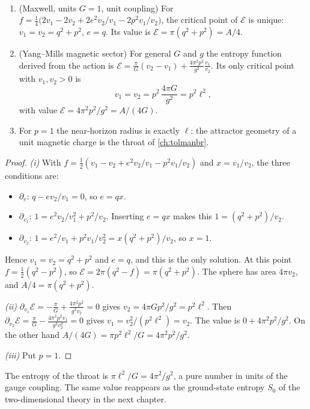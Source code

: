 \begin{theorem}[Attractor]\label{thm:attractor}\ver\
\begin{enumerate}[label=(\roman*)]
\item (Maxwell, units $G=1$, unit coupling) For $f=\frac14\bigl(2v_1-2v_2+2e^2v_2/v_1-2p^2v_1/v_2\bigr)$, the critical point of $\mathcal E$ is unique: $v_1=v_2=q^2+p^2$, $e=q$. Its value is $\mathcal E=\pi(q^2+p^2)=A/4$.
\item (Yang--Mills magnetic sector) For general $G$ and $g$ the entropy function derived from the action is $\mathcal E=\frac\pi G(v_2-v_1)+\frac{4\pi^2p^2}{g^2}\frac{v_1}{v_2}$. Its only critical point with $v_1,v_2>0$ is
\[
v_1=v_2=p^2\,\frac{4\pi G}{g^2}=p^2\ell^2,
\]
with value $\mathcal E=4\pi^2p^2/g^2=A/(4G)$.
\item For $p=1$ the near-horizon radius is exactly $\ell$: the attractor geometry of a unit magnetic charge is the throat of \cref{ch:tolmanbr}.
\end{enumerate}
\end{theorem}
\begin{proof}
\emph{(i)} With $f=\frac12(v_1-v_2+e^2v_2/v_1-p^2v_1/v_2)$ and $x=v_1/v_2$, the three conditions are:
\begin{itemize}[nosep]
\item $\partial_e$: $q-ev_2/v_1=0$, so $e=qx$.
\item $\partial_{v_1}$: $1=e^2v_2/v_1^2+p^2/v_2$. Inserting $e=qx$ makes this $1=(q^2+p^2)/v_2$.
\item $\partial_{v_2}$: $1=e^2/v_1+p^2v_1/v_2^2=x(q^2+p^2)/v_2$, so $x=1$.
\end{itemize}
Hence $v_1=v_2=q^2+p^2$ and $e=q$, and this is the only solution. At this point $f=\frac12(q^2-p^2)$, so $\mathcal E=2\pi(q^2-f)=\pi(q^2+p^2)$. The sphere has area $4\pi v_2$, and $A/4=\pi(q^2+p^2)$.

\emph{(ii)} $\partial_{v_1}\mathcal E=-\frac\pi G+\frac{4\pi^2p^2}{g^2v_2}=0$ gives $v_2=4\pi Gp^2/g^2=p^2\ell^2$. Then $\partial_{v_2}\mathcal E=\frac\pi G-\frac{4\pi^2p^2v_1}{g^2v_2^2}=0$ gives $v_1=v_2^2/(p^2\ell^2)=v_2$. The value is $0+4\pi^2p^2/g^2$. On the other hand $A/(4G)=\pi p^2\ell^2/G=4\pi^2p^2/g^2$.

\emph{(iii)} Put $p=1$.
\end{proof}


The entropy of the throat is $\pi\ell^2/G=4\pi^2/g^2$, a pure number in units of the gauge coupling. The same value reappears as the ground-state entropy $S_0$ of the two-dimensional theory in the next chapter.


